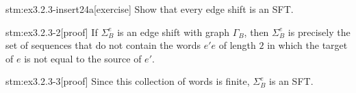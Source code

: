 
\begin{stm}{stm:ex3.2.3-insert24a}[exercise]
Show that every edge shift is an SFT.
\end{stm}

\begin{stm}{stm:ex3.2.3-2}[proof]
If $\Sigma_B^e$ is an edge shift with graph $\Gamma_B$, then $\Sigma_B^e$ is precisely the set of sequences that do not contain the words $e'e$ of length $2$ in which the target of $e$ is not equal to the source of $e'$.
\end{stm}

\begin{stm}{stm:ex3.2.3-3}[proof]
Since this collection of words is finite, $\Sigma_B^e$ is an SFT.
\end{stm}